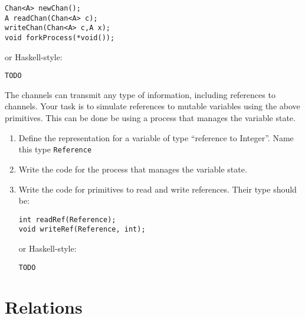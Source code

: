 \documentclass{article}
\begin{document}
\begin{verbatim}
Chan<A> newChan();
A readChan(Chan<A> c);
writeChan(Chan<A> c,A x);
void forkProcess(*void());
\end{verbatim}
or Haskell-style:
\begin{verbatim}
TODO
\end{verbatim}

The channels can transmit any type of information, including
references to channels. Your task is to simulate references to mutable
variables using the above primitives. This can be done be using a
process that manages the variable state.

\begin{enumerate}
\item Define the representation for a variable of type ``reference to
  Integer''. Name this type \texttt{Reference}
\item Write the code for the process that manages the variable state.
\item Write the code for primitives to read and write references.
Their type should be:
\begin{verbatim}
int readRef(Reference);
void writeRef(Reference, int);
\end{verbatim}
or Haskell-style:
\begin{verbatim}
TODO
\end{verbatim}
\end{enumerate}

\section{Relations}
\end{document}
